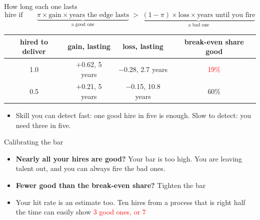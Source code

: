 \documentclass[aspectratio=169,10pt]{beamer}
\begin{document}
\begin{frame}{How long each one lasts}
\[ \text{hire if} \qquad \underbrace{\pi \times \text{gain} \times \text{years the edge lasts}}_{\text{a good one}}
   \;>\; \underbrace{(1-\pi) \times \text{loss} \times \text{years until you fire}}_{\text{a bad one}} \]
\vskip 2pt
\begin{center}
\renewcommand{\arraystretch}{1.4}
\begin{tabular}{cccc}
\toprule
hired to deliver & gain, lasting & loss, lasting & break-even share good \\
\midrule
1.0 & $+$0.62, 5 years & $-$0.28, 2.7 years & \textcolor{red}{19\%} \\
0.5 & $+$0.21, 5 years & $-$0.15, 10.8 years & 60\% \\
\bottomrule
\end{tabular}
\end{center}
\vskip 6pt
\begin{itemize}
\item Skill you can detect fast: one good hire in five is enough. Slow to detect: you need three in five.
\end{itemize}
\end{frame}

\begin{frame}[label=calibrate]{Calibrating the bar}
\begin{itemize}
\item \textbf{Nearly all your hires are good?} Your bar is too high. You are leaving talent out, and you can always fire the bad ones.
\vskip 14pt
\item \textbf{Fewer good than the break-even share?} Tighten the bar
\vskip 14pt
\item Your hit rate is an estimate too. Ten hires from a process that is right half the time can easily show \textcolor{red}{3 good ones, or 7}
\end{itemize}
\end{frame}
\end{document}
